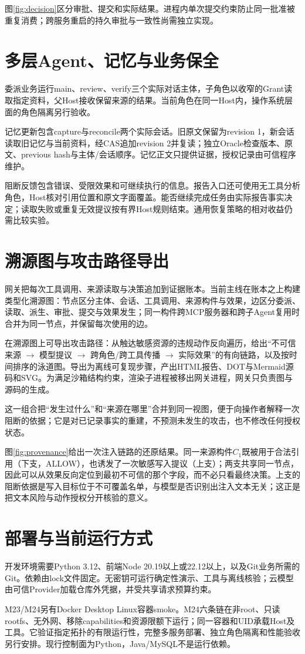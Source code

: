

图\ref{fig:decision}区分审批、提交和实际结果。进程内单次提交约束防止同一批准被重复消费；跨服务重启的持久审批与一致性尚需独立实现。

\section{多层Agent、记忆与业务保全}\label{sec:delegation}
委派业务运行main、review、verify三个实际对话主体，子角色以收窄的Grant读取指定资料，父Host接收保留来源的结果。当前角色在同一Host内，操作系统层面的角色隔离另行验收。

记忆更新包含capture与reconcile两个实际会话。旧原文保留为revision 1，新会话读取旧记忆与当前资料，经CAS追加revision 2并复读；独立Oracle检查版本、原文、previous hash与主体/会话顺序。记忆正文只提供证据，授权记录由可信程序维护。

阻断反馈包含错误、受限效果和可继续执行的信息。报告入口还可使用无工具分析角色，Host核对引用位置和原文字面覆盖。能否继续完成任务由实际报告事实决定；读取失败或重复无效提议按有界Host规则结束。通用恢复策略的相对收益仍需比较实验。

\section{溯源图与攻击路径导出}
网关把每次工具调用、来源读取与决策追加到证据账本。当前主线在账本之上构建类型化溯源图：节点区分主体、会话、工具调用、来源构件与效果，边区分委派、读取、派生、审批、提交与效果发生；同一构件跨MCP服务器和跨子Agent复用时合并为同一节点，并保留每次使用的边。

在溯源图上可导出攻击路径：从触达敏感资源的违规动作反向遍历，给出“不可信来源 \(\rightarrow\) 模型提议 \(\rightarrow\) 跨角色/跨工具传播 \(\rightarrow\) 实际效果”的有向链路，以及按时间排序的泳道图。导出为离线可复现步骤，产出HTML报告、DOT与Mermaid源码和SVG。为满足沙箱结构约束，渲染子进程被移出网关进程，网关只负责图与源码的生成。

这一组合把“发生过什么”和“来源在哪里”合并到同一视图，便于向操作者解释一次阻断的依据；它是对已记录事实的重建，不预测未发生的攻击，也不修改任何授权状态。



图\ref{fig:provenance}给出一次注入链路的还原结果。同一来源构件$C_1$既被用于合法引用（下支，ALLOW），也诱发了一次敏感写入提议（上支）；两支共享同一节点，因此可以从效果反向定位到最初不可信的那个字段，而不必只看最终决策。上支的阻断依据是写入目标位于不可覆盖名单，与模型是否识别出注入文本无关；这正是把文本风险与动作授权分开核验的意义。

\section{部署与当前运行方式}
开发环境需要Python 3.12、前端Node 20.19以上或22.12以上，以及Git业务所需的Git。依赖由lock文件固定。无密钥可运行确定性演示、工具与离线核验；云模型由可信Provider加载仓库外凭据，并受共享请求预算约束。

M23/M24另有Docker Desktop Linux容器smoke。M24六条链在非root、只读rootfs、无外网、移除capabilities和资源限额下运行；同一容器和UID承载Host及工具。它验证指定拓扑的有限运行性，完整多服务部署、独立角色隔离和性能验收另行安排。现行控制面为Python，Java/MySQL不是运行依赖。
